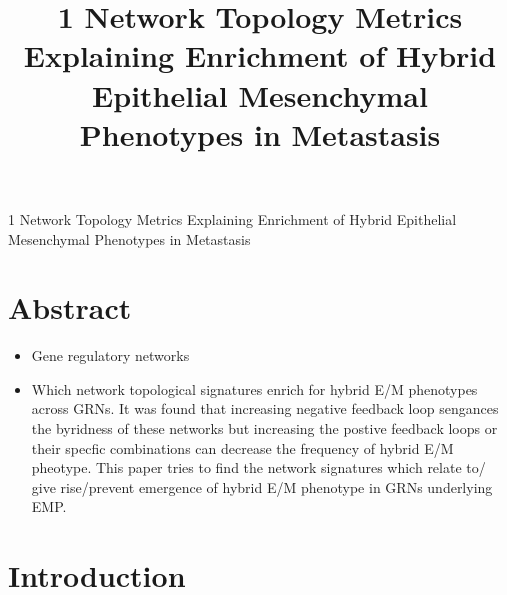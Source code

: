 \documentclass{article}
\title{1
Network Topology Metrics Explaining Enrichment of
Hybrid Epithelial Mesenchymal Phenotypes in Metastasis}
\author{}
\begin{document}
\maketitle

\href{https://www.biorxiv.org/content/10.1101/2022.05.16.492000v1.full.pdf}{}1
Network Topology Metrics Explaining Enrichment of
Hybrid Epithelial Mesenchymal Phenotypes in Metastasis 

\section{Abstract}
\begin{itemize}

\item Gene regulatory networks 

\item Which network topological signatures enrich for hybrid E/M phenotypes across GRNs. It was found that increasing negative feedback loop sengances the byridness of these networks but increasing the postive feedback loops or their specfic combinations can decrease the frequency of hybrid E/M pheotype. This paper tries to find the network signatures which relate to/ give rise/prevent emergence of hybrid E/M phenotype in GRNs underlying EMP.  

\end{itemize}

\section{Introduction}
\end{document}
